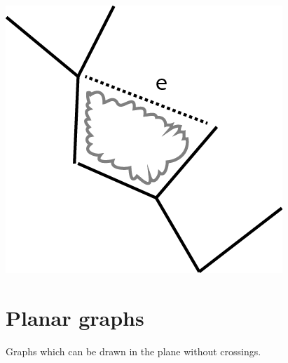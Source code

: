 \documentclass[9pt, letterpaper, oneside]{article}
\begin{document}
\includegraphics{fig9.png}

\section{Planar graphs}

Graphs which can be drawn in the plane without crossings.
\end{document}
